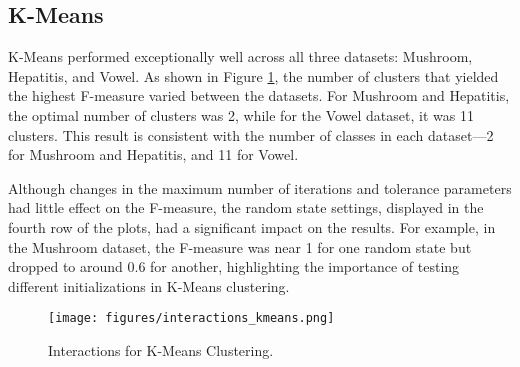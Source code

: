 \subsection{K-Means}
\label{subsec:kmeansresults}

K-Means performed exceptionally well across all three datasets: Mushroom, Hepatitis, and Vowel. As shown in Figure \ref{fig:interactions-kmeans}, the number of clusters that yielded the highest F-measure varied between the datasets. For Mushroom and Hepatitis, the optimal number of clusters was 2, while for the Vowel dataset, it was 11 clusters. This result is consistent with the number of classes in each dataset—2 for Mushroom and Hepatitis, and 11 for Vowel.

Although changes in the maximum number of iterations and tolerance parameters had little effect on the F-measure, the random state settings, displayed in the fourth row of the plots, had a significant impact on the results. For example, in the Mushroom dataset, the F-measure was near 1 for one random state but dropped to around 0.6 for another, highlighting the importance of testing different initializations in K-Means clustering.

\begin{figure}[h!]
    \centering
    \texttt{[image: figures/interactions\_kmeans.png]}
    \caption{Interactions for K-Means Clustering.}
    \label{fig:interactions-kmeans}
\end{figure}
